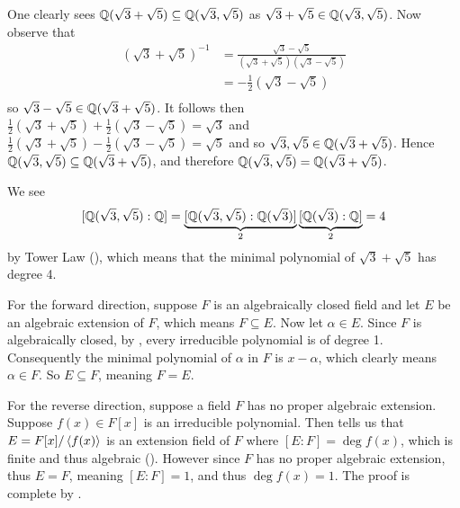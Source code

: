 \begin{questions}
    \item \begin{partquestions}{\roman*}
        \item One clearly sees $\mathbb{Q}(\sqrt3 + \sqrt5) \subseteq \mathbb{Q}(\sqrt3, \sqrt5)$ as $\sqrt3 + \sqrt5 \in \mathbb{Q}(\sqrt3, \sqrt5)$. Now observe that
        \begin{align*}
            \left(\sqrt3+\sqrt5\right)^{-1} &= \frac{\sqrt3-\sqrt5}{\left(\sqrt3+\sqrt5\right)\left(\sqrt3-\sqrt5\right)}\\
            &= -\frac12\left(\sqrt3-\sqrt5\right)\\
        \end{align*}
        so $\sqrt3-\sqrt5 \in \mathbb{Q}(\sqrt3 + \sqrt5)$. It follows then $\frac12\left(\sqrt3 + \sqrt5\right) + \frac12\left(\sqrt3 - \sqrt5\right) = \sqrt3$ and $\frac12\left(\sqrt3 + \sqrt5\right) - \frac12\left(\sqrt3 - \sqrt5\right) = \sqrt5$ and so $\sqrt3,\sqrt5\in\mathbb{Q}(\sqrt3+\sqrt5)$. Hence $\mathbb{Q}(\sqrt3,\sqrt5)\subseteq\mathbb{Q}(\sqrt3+\sqrt5)$, and therefore $\mathbb{Q}(\sqrt3, \sqrt5) = \mathbb{Q}(\sqrt3 + \sqrt5)$.

        \item We see
        \[
            [\mathbb{Q}(\sqrt3, \sqrt5): \mathbb{Q}] = \underbrace{[\mathbb{Q}(\sqrt3, \sqrt5): \mathbb{Q}(\sqrt3)]}_2\underbrace{[\mathbb{Q}(\sqrt3):\mathbb{Q}]}_2 = 4
        \]
        by Tower Law (), which means that the minimal polynomial of $\sqrt3+\sqrt5$ has degree 4.
    \end{partquestions}

    \item For the forward direction, suppose $F$ is an algebraically closed field and let $E$ be an algebraic extension of $F$, which means $F \subseteq E$. Now let $\alpha \in E$. Since $F$ is algebraically closed, by , every irreducible polynomial is of degree 1. Consequently the minimal polynomial of $\alpha$ in $F$ is $x - \alpha$, which clearly means $\alpha \in F$. So $E \subseteq F$, meaning $F = E$.

    For the reverse direction, suppose a field $F$ has no proper algebraic extension. Suppose $f(x) \in F[x]$ is an irreducible polynomial. Then  tells us that $E = F[x]/\left\langle f(x)\right\rangle$ is an extension field of $F$ where $[E:F] = \deg f(x)$, which is finite and thus algebraic (). However since $F$ has no proper algebraic extension, thus $E = F$, meaning $[E:F] = 1$, and thus $\deg f(x) = 1$. The proof is complete by .
\end{questions}

